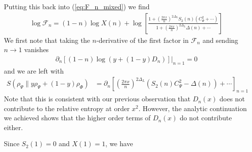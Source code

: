 \documentclass[11pt]{article}
\newcommand{\nn}{\nonumber}
\newcommand{\lb}{\left(}
\newcommand{\rb}{\right)}
\begin{document}
  Putting this back into (\ref{eq:F_n_mixed}) we find
    \begin{align}
    \log\mathcal{F}_{n}=(1-n)\log X(n)+\log\left[\frac{1+\lb \frac{2\pi x}{n}\rb^{2\Delta_L}S_{2}(n)\lb C_{\Psi}^{2}+\cdots\rb}{1+\lb \frac{2\pi x}{n}\rb^{2\Delta_L}\Delta(n)+\cdots}\right]
  \end{align}
  We first note that taking the $n$-derivative of the first factor in $\mathcal{F}
  _{n}$ and sending $n\to 1$ vanishes
  \begin{align}
    \partial_{n}\left[(1-n)\log(y+(1-y)D_{n})\right]\Big|_{n=1}=0
  \end{align}
  and we are left with
  \begin{align}
    S(\rho_\Psi\|y\rho_{\Psi}+(1-y)\rho_{\Phi}) & =\partial_{n}\left[\lb \frac{2\pi x}{n}\rb^{2\Delta_L}(S_{2}(n) C_\Psi^{2}-\Delta(n))+\cdots\right]_{n=1}
  \end{align}
Note that this is consistent with our previous observation that $D_n(x)$ does not contribute to the relative entropy at order $x^2$. However, the analytic continuation we achieved shows that the higher order terms of $D_n(x)$ do not contribute either.

  Since $S_{2}(1)=0$ and $X(1)=1$, we have
\end{document}
